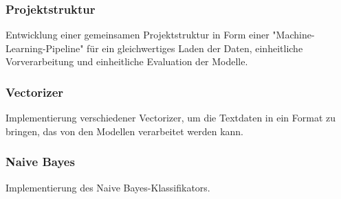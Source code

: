 \subsubsection{Projektstruktur}
Entwicklung einer gemeinsamen Projektstruktur in Form einer "Machine-Learning-Pipeline" für ein gleichwertiges Laden der Daten, einheitliche Vorverarbeitung und einheitliche Evaluation der Modelle.

\subsubsection{Vectorizer}
Implementierung verschiedener Vectorizer, um die Textdaten in ein Format zu bringen, das von den Modellen verarbeitet werden kann.

\subsubsection{Naive Bayes}
Implementierung des Naive Bayes-Klassifikators.

